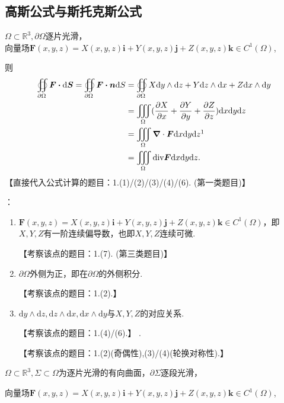 \documentclass[12pt,UTF8]{ctexart}
\newcommand{\varIIInt}[5]{\iiint\limits_{#1}#2\mathrm d#3\mathrm d#4\mathrm d#5}
\newcommand{\md}[1]{\mathrm d#1}
\newcommand{\pp}[2]{\frac{\partial #1}{\partial #2}}
\newcommand{\BSOIInt}[2]{\oiint\limits_{#1}#2}
\begin{document}
\subsection{高斯公式与斯托克斯公式}
\begin{enumerate}

$\Omega\subset\mathbb R^3,\partial\Omega$逐片光滑，\\
向量场$\bm F(x,y,z)=X(x,y,z)\bm i+Y(x,y,z)\bm j+Z(x,y,z)\bm k\in C^1(\Omega)$,

则
\[\begin{aligned}
\BSOIInt{\partial\Omega}{\bm F\bm\cdot\md\bm S}=\BSOIInt{\partial\Omega}{\bm F\bm\cdot\bm n\md S}&=\BSOIInt{\partial\Omega}{X\md y\wedge\md z+Y\md z\wedge\md x+Z\md x\wedge\md y}\\
&=\varIIInt\Omega{(\pp Xx+\pp Yy+\pp Zz)}xyz\\
&=\varIIInt\Omega{\bm\nabla\cdot\bm F}xyz\footnotemark\\
&=\varIIInt\Omega{\text{div}\bm F}xyz.
\end{aligned}\]
【直接代入公式计算的题目：1.(1)/(2)/(3)/(4)/(6). (第一类题目)】

{：}
\begin{enumerate}
，可添加简单曲面构造封闭区域，利用高斯公式计算.

【利用该点计算的题目：1.(5). (第二类题目)】

\item$\bm F(x,y,z)=X(x,y,z)\bm i+Y(x,y,z)\bm j+Z(x,y,z)\bm k\in C^1(\Omega)$，即$X,Y,Z$有一阶连续偏导数，也即$X,Y,Z$连续可微.

【考察该点的题目：1.(7). (第三类题目)】
\item$\partial\Omega$外侧为正，即在$\partial\Omega$的外侧积分.

【考察该点的题目：1.(2).】

\item$\md y\wedge\md z,\md z\wedge\md x,\md x\wedge\md y$与$X,Y,Z$的对应关系.

【考察该点的题目：1.(4)/(6).】
.

【考察该点的题目：1.(2)(奇偶性),(3)/(4)(轮换对称性).】
\end{enumerate}

$\Omega\subset\mathbb R^3,\Sigma\subset\Omega$为逐片光滑的有向曲面，$\partial\Sigma$逐段光滑，

向量场$\bm F(x,y,z)=X(x,y,z)\bm i+Y(x,y,z)\bm j+Z(x,y,z)\bm k\in C^1(\Omega)$,


\end{enumerate}
\end{document}
